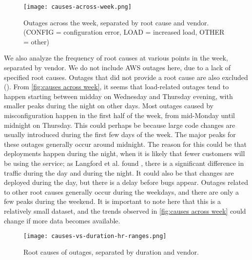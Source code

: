 \begin{figure}[h]
  \centering
  \texttt{[image: causes-across-week.png]}
  \caption{Outages across the week, separated by root cause and vendor. (CONFIG = configuration error, LOAD = increased load, OTHER = other)}
  \label{fig:causes across week}
\end{figure}

We also analyze the frequency of root causes at various points in the week, separated by vendor.
We do not include AWS outages here, due to a lack of specified root causes.
Outages that did not provide a root cause are also excluded ().
From \autoref{fig:causes across week}, it seems that load-related outages tend to happen starting between midday on Wednesday and Thursday evening, with smaller peaks during the night on other days.
Most outages caused by misconfiguration happen in the first half of the week, from mid-Monday until midnight on Thursday.
This could perhaps be because large code changes are usually introduced during the first few days of the week. %
The major peaks for these outages generally occur around midnight.
The reason for this could be that deployments happen during the night, when it is likely that fewer customers will be using the service; as Langford et al. found \cite{langford2012}, there is a significant difference in traffic during the day and during the night.
It could also be that changes are deployed during the day, but there is a delay before bugs appear.
Outages related to other root causes generally occur during the weekdays, and there are only a few peaks during the weekend.
It is important to note here that this is a relatively small dataset, and the trends observed in \autoref{fig:causes across week} could change if more data becomes available.

\begin{figure}[h]
  \centering
  \texttt{[image: causes-vs-duration-hr-ranges.png]}
  \caption{Root causes of outages, separated by duration and vendor.}
  \label{fig:causes vs duration ranges}
\end{figure}


